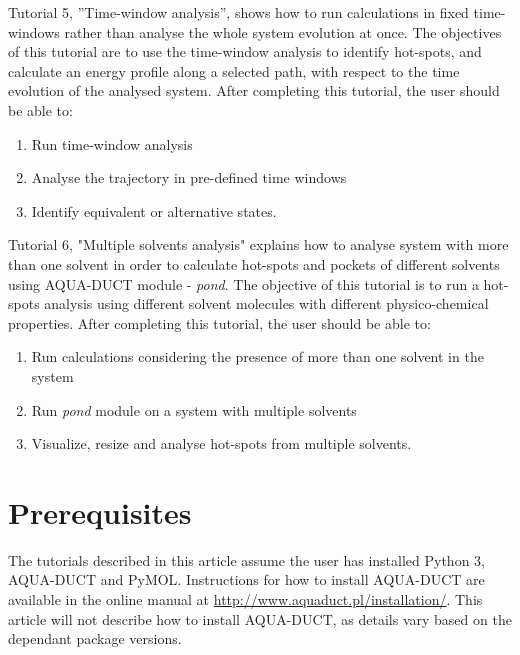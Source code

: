 \documentclass[9pt,tutorial, pubversion]{livecoms}
\begin{document}
Tutorial 5, ”Time-window analysis”, shows how to run calculations in fixed time-windows rather than analyse the whole system evolution at once. The objectives of this tutorial are to use the time-window analysis to identify hot-spots, and calculate an energy profile along a selected path, with respect to the time evolution of the analysed system. After completing this tutorial, the user should be able to:
\begin{enumerate}
  \item Run time-window analysis
  \item Analyse the trajectory in pre-defined time windows 
  \item Identify equivalent or alternative states. 
\end{enumerate}

Tutorial 6, "Multiple solvents analysis" explains how to analyse system with more than one solvent in order to calculate hot-spots and pockets of different solvents using AQUA-DUCT module - \textit{pond}. The objective of this tutorial is to run a hot-spots analysis using different solvent molecules with different physico-chemical properties. After completing this tutorial, the user should be able to:
\begin{enumerate}
  \item Run calculations considering the presence of more than one solvent in the system
  \item Run \textit{pond} module on a system with multiple solvents
  \item Visualize, resize and analyse hot-spots from multiple solvents.
\end{enumerate}

\section{Prerequisites}

The tutorials described in this article assume the user has installed Python 3, AQUA-DUCT and PyMOL. Instructions for how to install AQUA-DUCT are available in the online manual at \url{http://www.aquaduct.pl/installation/}. This article will not describe how to install AQUA-DUCT, as details vary based on the dependant package versions.
\end{document}

